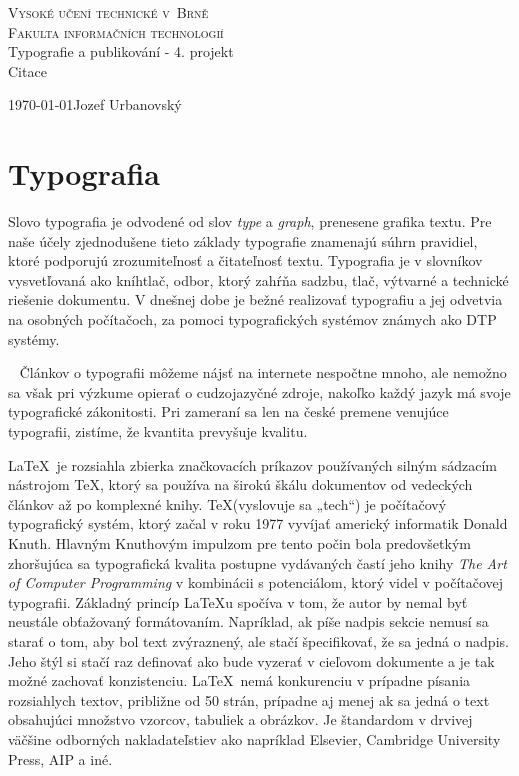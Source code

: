 \documentclass[12pt, a4paper, czech]{article}
\begin{document}
	\begin{center}
		\Huge
		\textsc{\Huge{Vysoké učení technické v~Brně}\\
			\huge{Fakulta informačních technologií}}\\
		\Large{Typografie a publikování - 4. projekt}\\
		\Huge{Citace}
	\end{center}
	\thispagestyle{empty}
	\normalsize{\today \hfill Jozef Urbanovský}
	\newpage
	
	\setcounter{page}{1}
	
	\section{Typografia}
	Slovo typografia je odvodené od slov \textit{type} a \textit{graph}, prenesene grafika textu.
	Pre naše účely zjednodušene tieto základy typografie znamenajú súhrn pravidiel, ktoré 
	podporujú zrozumiteľnosť a čitateľnosť textu. \cite{typo}	
	Typografia je v slovníkov vysvetľovaná ako kníhtlač, odbor, ktorý zahŕňa sadzbu, 
	tlač, výtvarné a technické riešenie dokumentu. 
	V dnešnej dobe je bežné realizovať typografiu a jej odvetvia
	na osobných počítačoch, za pomoci typografických systémov známych ako 
	DTP systémy. \cite{cerny} \par
	
	 
	Článkov o typografii môžeme nájsť na internete nespočtne mnoho, ale nemožno sa však
	pri výzkume opierať o cudzojazyčné zdroje, nakoľko každý jazyk má svoje typografické 
	zákonitosti. Pri zameraní sa len na české premene venujúce typografii, zistíme, že kvantita 
	prevyšuje kvalitu.  \cite{fiala} 
	\par
	
	\LaTeX\ je rozsiahla zbierka značkovacích príkazov používaných silným sádzacím 
	nástrojom \TeX, ktorý sa používa na širokú škálu dokumentov od vedeckých článkov 
	až po komplexné knihy. \cite{kopka} 
	\TeX (vyslovuje sa „tech“) je počítačový typografický systém, ktorý začal v roku 1977 vyvíjať
	americký informatik Donald Knuth. Hlavným Knuthovým impulzom pre tento počin bola predovšetkým
	zhoršujúca sa typografická kvalita postupne vydávaných častí jeho knihy \textit{The Art of
	Computer Programming} v kombinácii s potenciálom, ktorý videl v 
	počítačovej typografii. \cite{kosto} 
	Základný princíp \LaTeX u spočíva v tom, že autor by nemal byť neustále obťažovaný formátovaním.
	Napríklad, ak píše nadpis sekcie nemusí sa starať o tom, aby bol text zvýraznený, 
	ale stačí špecifikovať, že sa jedná o nadpis. Jeho štýl si stačí raz definovať 
	ako bude vyzerať v cieľovom dokumente a je tak možné zachovať konzistenciu.\cite{kottw}
	\LaTeX\ nemá konkurenciu v prípadne písania rozsiahlych textov, približne od 50 strán, 
	prípadne aj menej ak sa jedná o text obsahujúci množstvo vzorcov, tabuliek a obrázkov. 
	Je štandardom v drvivej väčšine odborných nakladateľstiev ako napríklad Elsevier, 
	Cambridge University Press, AIP a iné. \cite{groger} 
	\par
	
\end{document}
